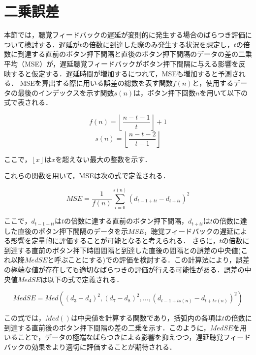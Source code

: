 \section{二乗誤差}
本節では，聴覚フィードバックの遅延が変則的に発生する場合のばらつき評価について検討する．遅延が$t$の倍数に到達した際のみ発生する状況を想定し，$t$の倍数に到達する直前のボタン押下間隔と直後のボタン押下間隔のデータの差の二乗平均（MSE）が，遅延聴覚フィードバックがボタン押下間隔に与える影響を反映すると仮定する．遅延時間が増加するにつれて，MSEも増加すると予測される．
MSEを算出する際に用いる誤差の総数を表す関数$f(n)$と，使用するデータの最後のインデックスを示す関数$s(n)$は，ボタン押下回数$n$を用いて以下の式で表される．

\begin{equation}
f(n) = \left\lfloor \frac{n-t-1}{t} \right\rfloor + 1
\end{equation}
\begin{equation}
s(n) = \left\lfloor \frac{n-t-2}{t-1} \right\rfloor
\end{equation}

ここで，$\left\lfloor x \right\rfloor$は$x$を超えない最大の整数を示す．

これらの関数を用いて，MSEは次の式で定義される．

\begin{equation}
MSE = \frac{1}{f(n)} \sum_{i=0}^{s(n)} (d_{t-1+ti} - d_{t+ti})^2
\end{equation}

ここで，$d_{t-1+ti}$は$t$の倍数に達する直前のボタン押下間隔，$d_{t+ti}$は$t$の倍数に達した直後のボタン押下間隔のデータを示$MSE$，聴覚フィードバックの遅延による影響を定量的に評価することが可能となると考えられる．
さらに，$t$の倍数に到達する直前のボタン押下時間間隔と到達した直後の間隔との誤差の中央値(これ以降$MedSE$と呼ぶことにする)での評価を検討する．この計算法により，誤差の極端な値が存在しても適切なばらつきの評価が行える可能性がある．誤差の中央値$MedSE$は以下の式で定義される．

\begin{equation}
MedSE = Med((d_{3}-d_{4})^2, (d_{7}-d_{8})^2, \ldots, (d_{t-1+ts(n)}-d_{t+ts(n)})^2)
\end{equation}

この式では，$Med()$は中央値を計算する関数であり，括弧内の各項は$t$の倍数に到達する直前後のボタン押下間隔の差の二乗を示す．このように，$MedSE$を用いることで，データの極端なばらつきによる影響を抑えつつ，遅延聴覚フィードバックの効果をより適切に評価することが期待される．

